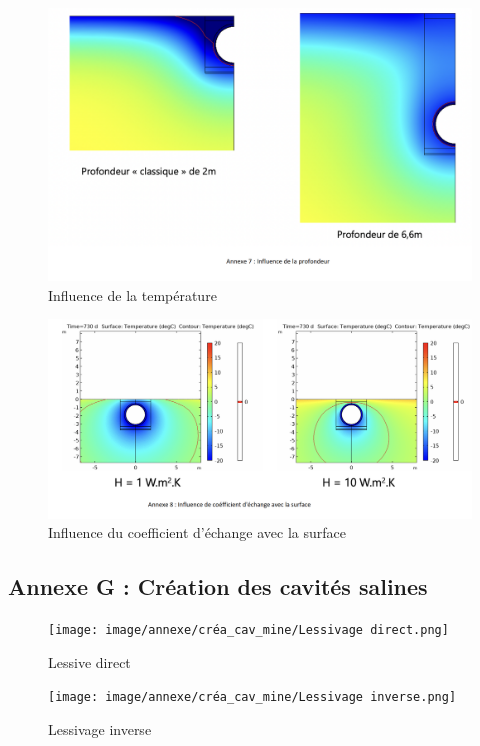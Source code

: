 \documentclass[11pt,french,a4paper]{article}
\begin{document}
\begin{figure}[!h]
\centering
\includegraphics[width=.8\linewidth]{image/annexe/reservoir_ent/Annexe_7.png}
\caption{Influence de la température}
\end{figure}
  
\begin{figure}[!h]
\centering
\includegraphics[width=.8\linewidth]{image/annexe/reservoir_ent/Annexe_9.png}
\caption{Influence du coefficient d'échange avec la surface}
\end{figure}

\FloatBarrier
\newpage
\subsection*{Annexe G : Création des cavités salines} 

\begin{figure}[!h]
  \centering
  \texttt{[image: image/annexe/créa\_cav\_mine/Lessivage direct.png]}
  \caption{Lessive direct}
  \end{figure}

\begin{figure}[!h]
  \centering
  \texttt{[image: image/annexe/créa\_cav\_mine/Lessivage inverse.png]}
  \caption{Lessivage inverse}
  \end{figure}
\end{document}
